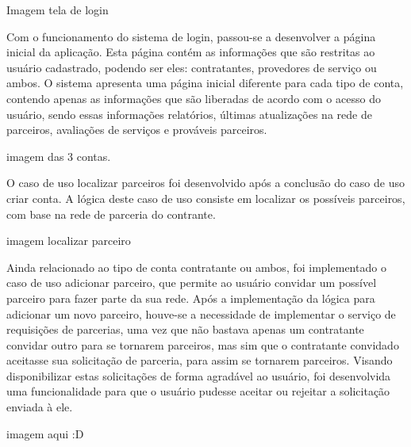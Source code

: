 Imagem tela de login

\par Com o funcionamento do sistema de login, passou-se a desenvolver a página inicial da aplicação. Esta página contém as informações que são restritas ao usuário cadastrado, podendo ser eles: contratantes, provedores de serviço ou ambos. O sistema apresenta uma página inicial diferente para cada tipo de conta, contendo apenas as informações que são liberadas de acordo com o acesso do usuário, sendo essas informações relatórios, últimas atualizações na rede de parceiros, avaliações de serviços e prováveis parceiros.

imagem das 3 contas.

\par O caso de uso localizar parceiros foi desenvolvido após a conclusão do caso de uso criar conta. A lógica deste caso de uso consiste em localizar os possíveis parceiros, com base na rede de parceria do contrante.

imagem localizar parceiro



\par Ainda relacionado ao tipo de conta contratante ou ambos, foi implementado o caso de uso adicionar parceiro, que permite ao usuário convidar um possível parceiro para fazer parte da sua rede. Após a implementação da lógica para adicionar um novo parceiro, houve-se a necessidade de implementar o serviço de requisições de parcerias, uma vez que não bastava apenas um contratante convidar outro para se tornarem parceiros, mas sim que o contratante convidado aceitasse sua solicitação de parceria, para assim se tornarem parceiros. Visando disponibilizar estas solicitações de forma agradável ao usuário, foi desenvolvida uma funcionalidade para que o usuário pudesse aceitar ou rejeitar a solicitação enviada à ele.

imagem aqui :D

\par  

 

 






